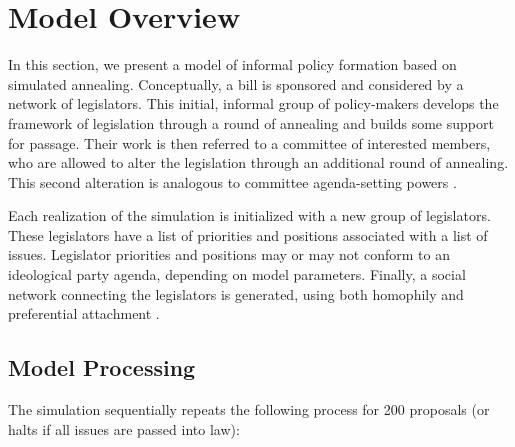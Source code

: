 \documentclass[pdftex,12pt]{llncs}
\begin{document}
\section{Model Overview}
In this section, we present a model of informal policy formation based on simulated annealing. 
Conceptually, a bill is sponsored and considered by a network of legislators. 
This initial, informal group of policy-makers develops the framework of legislation through a round of annealing and builds some support for passage. 
Their work is then referred to a committee of interested members, who are allowed to alter the legislation through an additional round of annealing. 
This second alteration is analogous to committee agenda-setting powers \parencite{cm93, cm05}. 

Each realization of the simulation is initialized with a new group of legislators.  
These legislators have a list of priorities and positions associated with a list of issues. Legislator priorities and positions may or may not conform to an ideological party agenda, depending on model parameters. 
Finally, a social network connecting the legislators is generated, using both homophily \parencite{msc01, br11} and preferential attachment \parencite{Barabasi1999}.

\subsection{Model Processing}
The simulation sequentially repeats the following process for 200 proposals (or halts if all issues are passed into law): 
\end{document}
